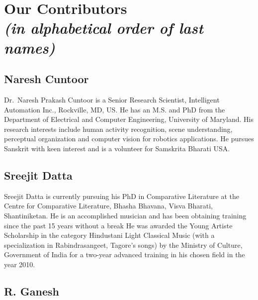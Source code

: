 \makeatletter
\def\@makeschapterhead#1{%
  \vspace*{50\p@}%
  {\parindent \z@ \raggedleft
    \normalfont
    \interlinepenalty\@M
    \LARGE \bfseries  #1\par\nobreak
    \vskip 20\p@
  }}
\makeatother

\chapter*{Our Contributors\\ {\rm\sl\small (in alphabetical order of last names)}}\label{contributors}


\chead[]{}
\cfoot[]{}

\section*{Naresh Cuntoor}

Dr.~Naresh Prakash Cuntoor is a Senior Research Scientist, Intelligent Automation Inc.,
Rockville, MD, US. He has an M.S. and PhD from the Department of Electrical and
Computer Engineering, University of Maryland. His research interests include human
activity recognition, scene understanding, perceptual organization and computer vision for
robotics applications. He pursues Sanskrit with keen interest and is a volunteer for
Samskrita Bharati USA.

\section*{Sreejit Datta}

Sreejit Datta is currently pursuing his PhD in Comparative Literature at the Centre
for Comparative Literature, Bhasha Bhavana, Visva Bharati, Shantiniketan. He is
an accomplished musician and has been obtaining training since the past 15 years
without a break He was awarded the Young Artiste Scholarship in the category
Hindustani Light Classical Music (with a specialization in Rabindrasangeet,
Tagore's songs) by the Ministry of Culture, Government of India for a two-year
advanced training in his chosen field in the year 2010.

\section*{R. Ganesh}

